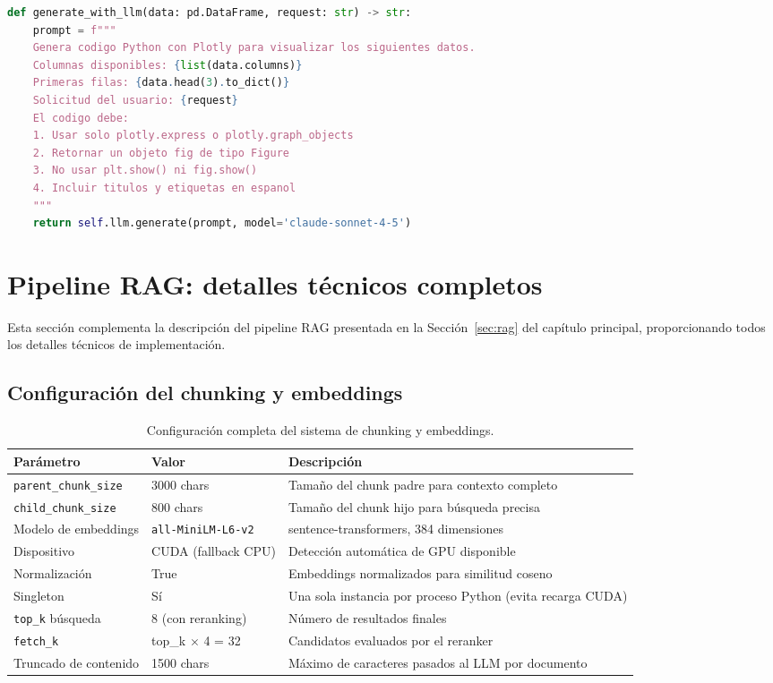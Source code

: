 \begin{lstlisting}[language=Python, basicstyle=\tiny\ttfamily, backgroundcolor=\color{codebg}]
def generate_with_llm(data: pd.DataFrame, request: str) -> str:
    prompt = f"""
    Genera codigo Python con Plotly para visualizar los siguientes datos.
    Columnas disponibles: {list(data.columns)}
    Primeras filas: {data.head(3).to_dict()}
    Solicitud del usuario: {request}
    El codigo debe:
    1. Usar solo plotly.express o plotly.graph_objects
    2. Retornar un objeto fig de tipo Figure
    3. No usar plt.show() ni fig.show()
    4. Incluir titulos y etiquetas en espanol
    """
    return self.llm.generate(prompt, model='claude-sonnet-4-5')
\end{lstlisting}

\section{Pipeline \acs{RAG}: detalles técnicos completos}
\label{sec:appendix_rag}

Esta sección complementa la descripción del pipeline \ac{RAG} presentada en la Sección~\ref{sec:rag} del capítulo principal, proporcionando todos los detalles técnicos de implementación.

\subsection{Configuración del chunking y embeddings}

\begin{table}[H]
\centering
\caption{Configuración completa del sistema de chunking y embeddings.}
\label{tab:appendix_chunking}
\footnotesize
\begin{tabularx}{\columnwidth}{llX}
\toprule
\textbf{Parámetro} & \textbf{Valor} & \textbf{Descripción} \\
\midrule
\texttt{parent\_chunk\_size} & 3000 chars & Tamaño del chunk padre para contexto completo \\
\texttt{child\_chunk\_size} & 800 chars & Tamaño del chunk hijo para búsqueda precisa \\
Modelo de embeddings & \texttt{all-MiniLM-L6-v2} & sentence-transformers, 384 dimensiones \\
Dispositivo & CUDA (fallback CPU) & Detección automática de GPU disponible \\
Normalización & True & Embeddings normalizados para similitud coseno \\
Singleton & Sí & Una sola instancia por proceso Python (evita recarga CUDA) \\
\texttt{top\_k} búsqueda & 8 (con reranking) & Número de resultados finales \\
\texttt{fetch\_k} & top\_k $\times$ 4 = 32 & Candidatos evaluados por el reranker \\
Truncado de contenido & 1500 chars & Máximo de caracteres pasados al \ac{LLM} por documento \\
\bottomrule
\end{tabularx}
\end{table}

